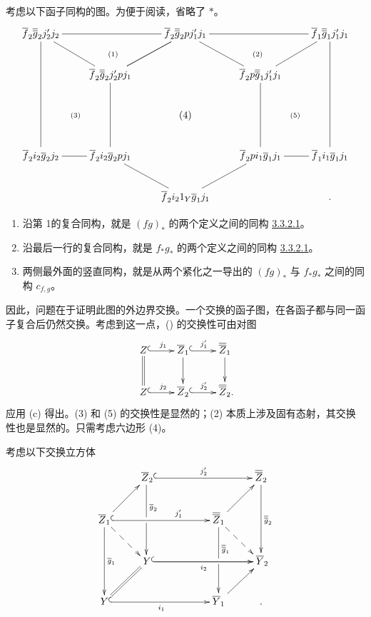 考虑以下函子同构的图。为便于阅读，省略了 ${\ast}$。
\[
\xymatrix{
\bar{f}_2 \bar{\bar{g}}_2j'_2j_2\sisi{}{\ar@{}[rrd]|{(1)}} \ar@{-}[rr] \ar@{-}[ddd] \ar@{-}[rd]& &
\bar{f}_2\bar{\bar{g}}_2pj'_1j_1
\ar@{-}[rr] \ar@{-}[ld] \ar@{-}[rd]& &\bar{f}_1\bar{\bar{g}}_1j'_1j_1 \ar@{-}[ddd]\sisi{}{\ar@{}[lld]|{(2)}}\\
 \ar@{}[ddr]|{(3)} & \bar{f}_2\bar{\bar{g}}_2j'_2pj_1\ar@{-}[ru] \ar@{-}[dd]& &
\bar{f}_2p\bar{\bar{g}}_1j'_1j_1 \ar@{-}[dd]\ar@{-}[ru]& \ar@{}[ldd]|{(5)}\\
 &  &  (4)  & &\\
\bar{f}_2i_2\bar{g}_2j_2 \ar@{-}[r] & \bar{f}_2i_2\bar{g}_2pj_1 & &
\bar{f}_2pi_1\bar{g}_1j_1 \ar@{-}[r]&  \bar{f}_1i_1\bar{g}_1j_1\\
& &  \bar{f}_2i_21_Y\bar{g}_1j_1 \ar@{-}[ru]\ar@{-}[lu]& & .\\
}
\]

\begin{enumerate}
\renewcommand{\theenumi}{\alph{enumi}}
\renewcommand{\labelenumi}{\theenumi)}
\item 沿第 1的复合同构\pageoriginale，就是 $(fg)_{\ast}$ 的两个定义之间的同构 \hyperref[XVII.par3.3.2.1]{3.3.2.1}。

\item 沿最后一行的复合同构，就是 $f_{\ast}g_{\ast}$ 的两个定义之间的同构 \hyperref[XVII.par3.3.2.1]{3.3.2.1}。

\item 两侧最外面的竖直同构，就是从两个紧化之一导出的 $(fg)_{\ast}$ 与 $f_{\ast}g_{\ast}$ 之间的同构 $c_{f,g}$。
\end{enumerate}
因此，问题在于证明此图的外边界交换。一个交换的函子图，在各函子都与同一函子复合后仍然交换。考虑到这一点，() 的交换性可由对图
\[
\xymatrix{
Z  \ar@{^{(}->}[r]^{j_1} \ar@{=}[d]& \bar{Z}_1  \ar@{^{(}->}[r]^{j'_1} \ar[d]& \bar{\bar{Z}}_1 \ar[d]\\
Z  \ar@{^{(}->}[r]^{j_2} & \bar{Z}_2  \ar@{^{(}->}[r]^{j'_2} & \bar{\bar{Z}}_2\rlap{.}
}
\]
应用 (c) 得出。(3) 和 (5) 的交换性是显然的；(2) 本质上涉及固有态射，其交换性也是显然的。只需考虑六边形 (4)。

考虑以下交换立方体
\[
\xymatrix{
                              &**[r]\bar{Z}_2  \ar@{^{(}->}[rrr]^{ j'_2}
                              \ar[dd]^(.35){\bar{g}_2}|\hole &    &   &
                              **[r]\bar{\bar{Z}}_2 \ar[dd]^{\bar{\bar{g}}_2}\\
  \bar{Z}_1\sisi{}{\ar@{-->}[rd]}  \ar@{^{(}->}[rrr]^(.65){ j'_1} \ar[ru] \ar[dd]^{\bar{g}_1}   &           &               &
                              \bar{\bar{Z}}_1 \ar[ru]\ar@{-->}[rd] \ar[dd]^(.35){\bar{\bar{g}}_1}|\hole&\\
& **[r] Y\ar[rrr]_{i_2}  \ar@{^{(}->}[rrr]  & && **[r]\bar{Y}_2 \\
Y  \ar@{^{(}->}[rrr]_{i_1}   \ar@{=}[ru]  &           &               &
                              \bar{Y}_1\ar[ru]  &.\\
}
\]

